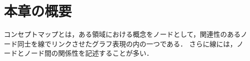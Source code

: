 \section{本章の概要}
コンセプトマップ\cite{concept}とは，ある領域における概念をノードとして，関連性のあるノード同士を線でリンクさせたグラフ表現の内の一つである．
さらに線には，ノードとノード間の関係性を記述することが多い．